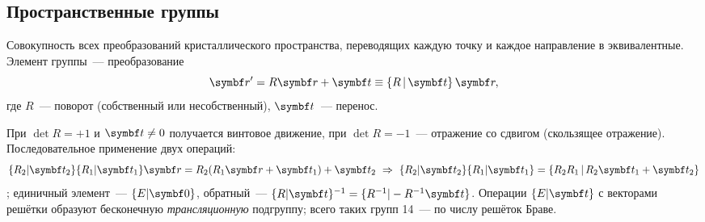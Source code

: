 \subsection{Пространственные группы}\label{ssec:space-groups}

\begin{opredelenie}
Совокупность всех преобразований кристаллического пространства,
переводящих каждую точку и каждое направление в эквивалентные.
Элемент группы~— преобразование
\begin{equation}\label{eq:seitz}
\vb r'=R\vb r+\vb t\equiv\{R\,|\,\vb t\}\,\vb r ,
\end{equation}
где $R$~— поворот (собственный или несобственный), $\vb t$~— перенос.
\end{opredelenie}

При $\det R=+1$ и $\vb t\ne0$ получается винтовое движение, при $\det R=-1$~—
отражение со сдвигом (скользящее отражение). Последовательное
применение двух операций:
\begin{equation}\label{eq:seitz-product}
\{R_2|\vb t_2\}\{R_1|\vb t_1\}\vb r=R_2(R_1\vb r+\vb t_1)+\vb t_2
\ \Rightarrow\ \{R_2|\vb t_2\}\{R_1|\vb t_1\}=\{R_2R_1\,|\,R_2\vb t_1+\vb t_2\}
\end{equation}
; единичный элемент~—
$\{E|\vb 0\}$, обратный~— $\{R|\vb t\}^{-1}=\{R^{-1}|-R^{-1}\vb t\}$. Операции $\{E|\vb t\}$
с векторами решётки образуют бесконечную \emph{трансляционную} подгруппу;
всего таких групп 14~— по числу решёток Браве.

